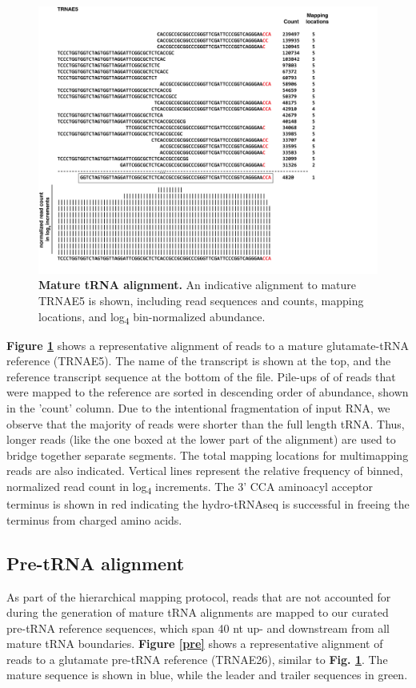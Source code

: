\documentclass[12pt]{rockefeller}
\newcommand{\sub}[1]{\textsubscript{#1}}
\begin{document}
\begin{figure}[!ht]%
\centering
\includegraphics[width=\textwidth]{mature.png}%
\caption[Mature tRNA alignment]{\textbf{Mature tRNA alignment.} An indicative alignment to mature TRNAE5 is shown, including read sequences and counts, mapping locations, and log\sub{4} bin-normalized abundance.}
\centering
\label{mature}%
\end{figure}

\textbf{Figure \ref{mature}} shows a representative alignment of reads to a mature glutamate-tRNA reference (TRNAE5). The name of the transcript is shown at the top, and the reference transcript sequence at the bottom of the file. Pile-ups of of reads that were mapped to the reference are sorted in descending order of abundance, shown in the 'count' column. Due to the intentional fragmentation of input RNA, we observe that the majority of reads were shorter than the full length tRNA. Thus, longer reads (like the one boxed at the lower part of the alignment) are used to bridge together separate segments. The total mapping locations for multimapping reads are also indicated.  Vertical lines represent the relative frequency of binned, normalized read count in log\sub{4} increments. The 3’ CCA aminoacyl acceptor terminus is shown in red indicating the hydro-tRNAseq is successful in freeing the terminus from charged amino acids. 

\subsection{Pre-tRNA alignment}
As part of the hierarchical mapping protocol, reads that are not accounted for during the generation of mature tRNA alignments are mapped to our curated pre-tRNA reference sequences, which span 40 nt up- and downstream from all mature tRNA boundaries. \textbf{Figure \ref{pre}} shows a representative alignment of reads to a glutamate pre-tRNA reference (TRNAE26), similar to \textbf{Fig. \ref{mature}}. The mature sequence is shown in blue, while the leader and trailer sequences in green. 
\end{document}
